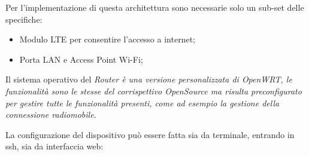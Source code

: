Per l'implementazione di questa architettura sono necessarie solo un sub-set delle specifiche:

\begin{itemize}[nosep]
	\item Modulo LTE per consentire l'accesso a internet;
	\item Porta LAN e Access Point Wi-Fi;
\end{itemize}

\newpage


Il sistema operativo del \it{Router} è una versione personalizzata di OpenWRT, le funzionalità sono le stesse del corrispettivo OpenSource ma risulta preconfigurato per gestire tutte le funzionalità presenti, come ad esempio la gestione della connessione radiomobile.

La configurazione del dispositivo può essere fatta sia da terminale, entrando in ssh, sia da interfaccia web:

